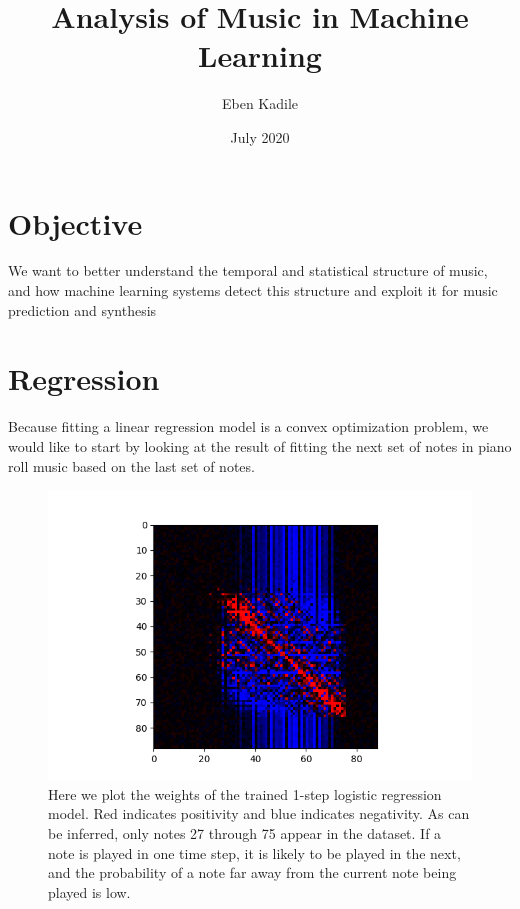 \documentclass{article}
\title{Analysis of Music in Machine Learning}
\author{Eben Kadile}
\date{July 2020}
\begin{document}
\maketitle

\section{Objective}

We want to better understand the temporal and statistical structure of music, and how machine learning systems detect this structure and exploit it for music prediction and synthesis

\section{Regression}

Because fitting a linear regression model is a convex optimization problem, we would like to start by looking at the result of fitting the next set of notes in piano roll music based on the last set of notes.

\begin{figure}
    \centering
    \includegraphics{figures/regression_weights.png}
    \caption{Here we plot the weights of the trained 1-step logistic regression model. Red indicates positivity and blue indicates negativity. As can be inferred, only notes 27 through 75 appear in the dataset. If a note is played in one time step, it is likely to be played in the next, and the probability of a note far away from the current note being played is low.}
\end{figure}
\end{document}
